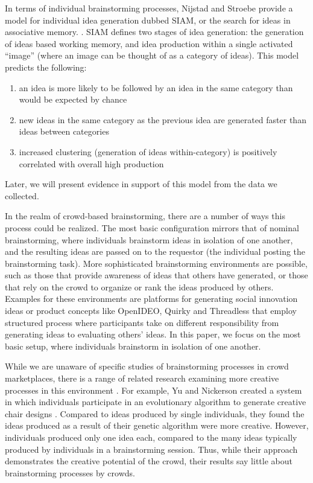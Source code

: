In terms of individual brainstorming processes, Nijstad and Stroebe provide a model for individual idea generation dubbed SIAM, or the search for ideas in associative memory. \cite{nijstad_how_2006}. SIAM defines two stages of idea generation: the generation of ideas based working memory, and idea production within a single activated ``image'' (where an image can be thought of as a category of ideas). This model predicts the following:

\begin{enumerate}
\item an idea is more likely to be followed by an idea in the same category than would be expected by chance
\item new ideas in the same category as the previous idea are generated faster than ideas between categories
\item increased clustering (generation of ideas within-category) is positively correlated with overall high production
\end{enumerate}

Later, we will present evidence in support of this model from the data we collected.

In the realm of crowd-based brainstorming, there are a number of ways this process could be realized. The most basic configuration mirrors that of nominal brainstorming, where individuals brainstorm ideas in isolation of one another, and the resulting ideas are passed on to the requestor (the individual posting the brainstorming task). More sophisticated brainstorming environments are possible, such as those that provide awareness of ideas that others have generated, or those that rely on the crowd to organize or rank the ideas produced by others. Examples for these environments are platforms for generating social innovation ideas or product concepts like OpenIDEO, Quirky and Threadless that employ structured process where participants take on different responsibility from generating ideas to evaluating others' ideas. In this paper, we focus on the most basic setup, where individuals brainstorm in isolation of one another.

While we are unaware of specific studies of brainstorming processes in crowd marketplaces, there is a range of related research examining more creative processes in this environment \cite{lewis2011affective, kittur2011crowdforge, Zhang:2012:HCT:2207676.2207708}. For example, Yu and Nickerson created a system in which individuals participate in an evolutionary algorithm to generate creative chair designs \cite{yu_cooks_2011}. Compared to ideas produced by single individuals, they found the ideas produced as a result of their genetic algorithm were more creative. However, individuals produced only one idea each, compared to the many ideas typically produced by individuals in a brainstorming session. Thus, while their approach demonstrates the creative potential of the crowd, their results say little about brainstorming processes by crowds. 

